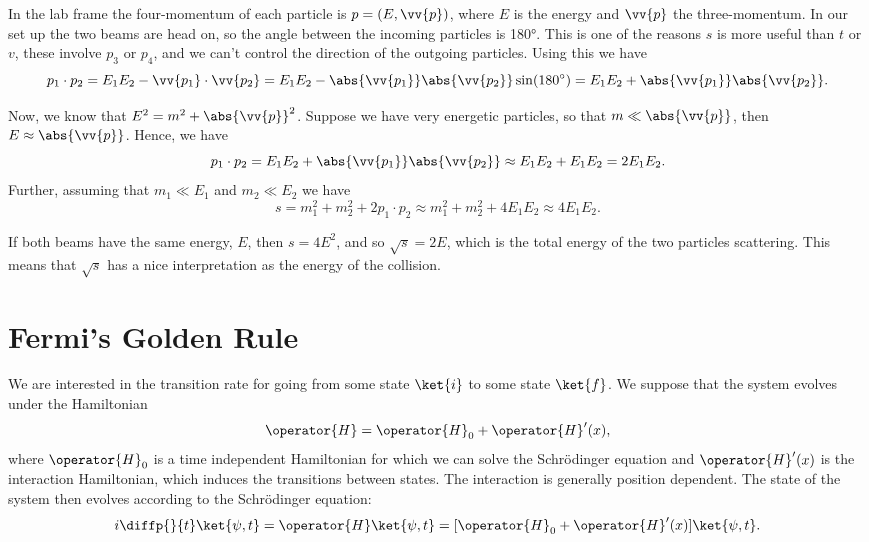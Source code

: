\documentclass[fleqn]{NotesClass}
\begin{document}
    In the lab frame the four-momentum of each particle is \(p = (E, \vv{p})\), where \(E\) is the energy and \(\vv{p}\) the three-momentum.
    In our set up the two beams are head on, so the angle between the incoming particles is \ang{180}.
    This is one of the reasons \(s\) is more useful than \(t\) or \(v\), these involve \(p_3\) or \(p_4\), and we can't control the direction of the outgoing particles.
    Using this we have
    \begin{equation}
        p_1 \cdot p_2 = E_1E_2 - \vv{p_1}\cdot \vv{p_2} = E_1E_2 - \abs{\vv{p_1}}\abs{\vv{p_2}}\sin(\ang{180}) = E_1E_2 + \abs{\vv{p_1}}\abs{\vv{p_2}}.
    \end{equation}
    
    Now, we know that \(E^2 = m^2 + \abs{\vv{p}}^2\).
    Suppose we have very energetic particles, so that \(m \ll \abs{\vv{p}}\), then \(E \approx \abs{\vv{p}}\).
    Hence, we have
    \begin{equation}
        p_1 \cdot p_2 = E_1E_2 + \abs{\vv{p_1}}\abs{\vv{p_2}} \approx E_1 E_2 + E_1E_2 = 2E_1E_2.
    \end{equation}
    Further, assuming that \(m_1 \ll E_1\) and \(m_2 \ll E_2\) we have
    \begin{equation}
        s = m_1^2 + m_2^2 + 2p_1 \cdot p_2 \approx m_1^2 + m_2^2 + 4E_1E_2 \approx 4E_1E_2.
    \end{equation}
    
    If both beams have the same energy, \(E\), then \(s = 4E^2\), and so \(\sqrt{s} = 2E\), which is the total energy of the two particles scattering.
    This means that \(\sqrt{s}\) has a nice interpretation as the energy of the collision.
    
    \section{Fermi's Golden Rule}
    We are interested in the transition rate for going from some state \(\ket{i}\) to some state \(\ket{f}\).
    We suppose that the system evolves under the Hamiltonian
    \begin{equation}
        \operator{H} = \operator{H}_0 + \operator{H}'(x),
    \end{equation}
    where \(\operator{H}_0\) is a time independent Hamiltonian for which we can solve the Schrödinger equation and \(\operator{H}'(x)\) is the interaction Hamiltonian, which induces the transitions between states.
    The interaction is generally position dependent.
    The state of the system then evolves according to the Schrödinger equation:
    \begin{equation}
        i \diffp{}{t}\ket{\psi, t} = \operator{H}\ket{\psi, t} = [\operator{H}_0 + \operator{H}'(x)]\ket{\psi, t}.
    \end{equation}
    
\end{document}
